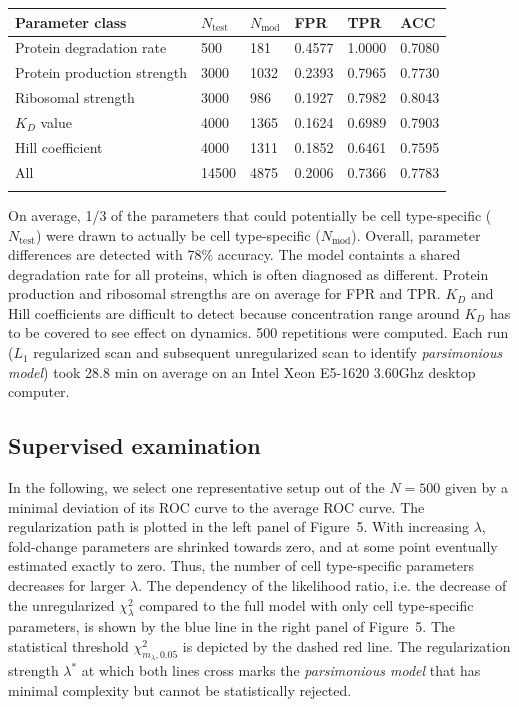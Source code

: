 \documentclass{bioinfo}
\begin{document}
\begin{table}[!t]
 {\begin{tabular}{@{}llllll@{}}\toprule Parameter class &
$N_\text{test}$ & $N_\text{mod}$ & FPR & TPR & ACC\\\midrule
Protein degradation rate & 500 & 181 & 0.4577 & 1.0000 & 0.7080\\
Protein production strength & 3000 & 1032 & 0.2393 & 0.7965 & 0.7730\\
Ribosomal strength & 3000 & 986 & 0.1927 & 0.7982 & 0.8043\\
$K_D$ value & 4000 & 1365 & 0.1624 & 0.6989 & 0.7903\\
Hill coefficient & 4000 & 1311 & 0.1852 & 0.6461 & 0.7595\\\hline
All & 14500 & 4875 & 0.2006 & 0.7366 & 0.7783\\\botrule
\end{tabular}}{On average, 1/3 of the parameters that could potentially be cell type-specific ($N_\text{test}$) were drawn to actually be cell type-specific ($N_\text{mod}$). Overall, parameter differences are detected with 78\% accuracy. The model containts a shared degradation rate for all proteins, which is often diagnosed as different. Protein production and ribosomal strengths are on average for FPR and TPR. $K_D$ and Hill coefficients are difficult to detect because concentration range around $K_D$ has to be covered to see effect on dynamics. 500 repetitions were computed. Each run ($L_1$ regularized scan and subsequent unregularized scan to identify \emph{parsimonious model}) took 28.8 min on average on an Intel Xeon E5-1620 3.60Ghz desktop computer.}
\end{table}

\subsection{Supervised examination} %
In the following, we select one representative setup out of the $N=500$ given by a minimal deviation of its ROC curve to the average ROC curve.
The regularization path is plotted in the left panel of Figure~5\vphantom{\ref{fig:05}}.
With increasing $\lambda$, fold-change parameters are shrinked towards zero, and at some point eventually estimated exactly to zero.
Thus, the number of cell type-specific parameters decreases for larger $\lambda$.
The dependency of the likelihood ratio, i.e. the decrease of the unregularized $\chi_\lambda^2$ compared to the full model with only cell type-specific parameters, is shown by the blue line in the right panel of Figure~5\vphantom{\ref{fig:05}}.
The statistical threshold $\chi^2_{m_\lambda,0.05}$ is depicted by the dashed red line.
The regularization strength $\lambda^*$ at which both lines cross marks the \emph{parsimonious model} that has minimal complexity but cannot be statistically rejected.
\end{document}
